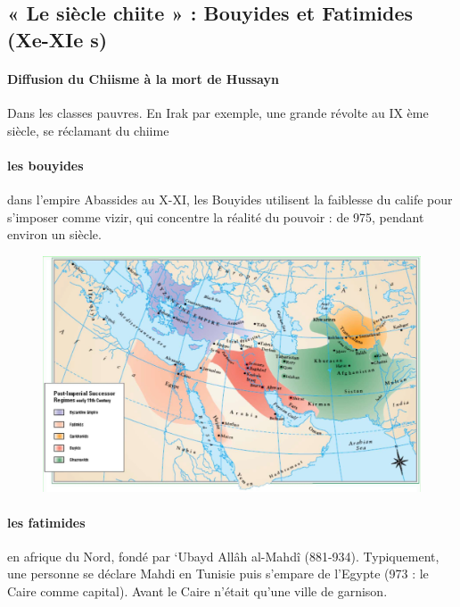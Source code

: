  
 
 \subsection{ « Le siècle chiite » : Bouyides et Fatimides (Xe-XIe s)}
 
 
 \paragraph{Diffusion du Chiisme à la mort de Hussayn} Dans les classes pauvres. En Irak par exemple, une grande révolte au IX ème siècle, se réclamant du chiime
 
 \paragraph{les bouyides} dans l'empire Abassides au X-XI, les Bouyides utilisent la faiblesse du calife pour s'imposer comme vizir, qui concentre la réalité du pouvoir : de 975, pendant environ un siècle.  
 
 \begin{figure}
     \centering
 
\includegraphics[width=\textwidth]{CourantsIslamContemporain/ImagesCourantsIslamContemporain/Image1Chiisme.jpeg}

     \label{fig:my_label}
 \end{figure}
 
 \paragraph{les fatimides} en afrique du Nord, fondé  par `Ubayd Allâh al-Mahdî (881-934). Typiquement, une personne se déclare Mahdi en Tunisie puis s'empare de l'Egypte (973 : le Caire comme capital). Avant le Caire n'était qu'une ville de garnison. 
 
